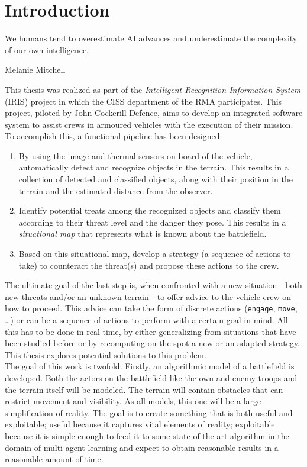 \chapter{Introduction}

\epigraph{We humans tend to overestimate AI advances and underestimate the complexity of our own intelligence.} {Melanie Mitchell}
This thesis was realized as part of the \emph{Intelligent Recognition Information System} (IRIS) project in which the CISS department of the RMA participates. This project, piloted by John Cockerill Defence, aims to develop an integrated software system to assist crews in armoured vehicles with the execution of their mission. To accomplish this, a functional pipeline has been designed:
\begin{enumerate}
    \item By using the image and thermal sensors on board of the vehicle, automatically detect and recognize objects in the terrain. This results in a collection of detected and classified objects, along with their position in the terrain and the estimated distance from the observer. 
    \item Identify potential treats among the recognized objects and classify them according to their threat level and the danger they pose. This results in a \emph{situational map} that represents what is known about the battlefield.
    \item Based on this situational map, develop a strategy (a sequence of actions to take) to counteract the threat(s) and propose these actions to the crew.
\end{enumerate}
The ultimate goal of the last step is, when confronted with a new situation - both new threats and/or an unknown terrain - to offer advice to the vehicle crew on how to proceed. This advice can take the form of discrete actions ({\tt engage}, {\tt move}, \ldots) or can be a sequence of actions to perform with a certain goal in mind. All this has to be done in real time, by either generalizing from situations that have been studied before or by recomputing on the spot a new or an adapted strategy. This thesis explores potential solutions to this problem.\\
The goal of this work is twofold. Firstly, an algorithmic model of a battlefield is developed. Both the actors on the battlefield like the own and enemy troops and the terrain itself will be modeled. The terrain will contain obstacles that can restrict movement and visibility. As all models, this one will be a large simplification of reality. The goal is to create something that is both useful and exploitable; useful because it captures vital elements of reality; exploitable because it is simple enough to feed it to some state-of-the-art algorithm in the domain of multi-agent learning and expect to obtain reasonable results in a reasonable amount of time.\\

